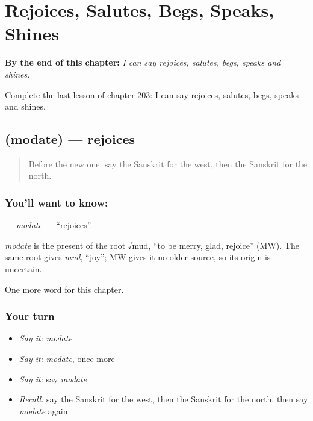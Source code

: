 
\chapter{Rejoices, Salutes, Begs, Speaks, Shines}
\label{ch:sa-rejoices-salutes-begs-speaks-shines}

\begin{chapteropening}
\textbf{By the end of this chapter:} \emph{I can say rejoices, salutes, begs, speaks and shines.}

Complete the last lesson of chapter 203: I can say rejoices, salutes, begs, speaks and shines.
\end{chapteropening}

\section[\texorpdfstring{\sk{मोदते} (modate)}{मोदते (modate)}]{ (modate) — rejoices}

\label{lesson:SA-C203-modate}



\begin{quote}
Before the new one: say the Sanskrit for the west, then the Sanskrit for the north.
\end{quote}

\subsection*{You'll want to know: }
\textbf{} — \emph{modate} — \textquotedblleft{}rejoices\textquotedblright{}.

\begin{cousinweb}
\emph{modate} is the present of the root √mud, \textquotedblleft{}to be merry, glad, rejoice\textquotedblright{} (MW). The same root gives \emph{mud}, \textquotedblleft{}joy\textquotedblright{}; MW gives it no older source, so its origin is uncertain.
\end{cousinweb}

\begin{grammarlens}[title={What you've built}]
One more word for this chapter.
\end{grammarlens}

\subsection*{Your turn}
\begin{itemize}
\raggedright
  \item \emph{Say it:} \emph{modate}
  \item \emph{Say it:} \emph{modate}, once more
  \item \emph{Say it:} say \emph{modate}
  \item \emph{Recall:} say the Sanskrit for the west, then the Sanskrit for the north, then say \emph{modate} again
\end{itemize}


